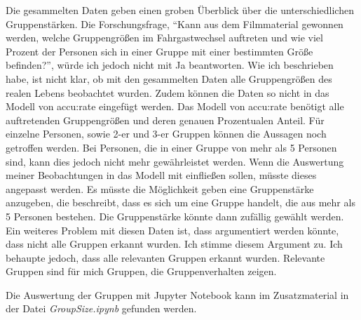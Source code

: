 Die gesammelten Daten geben einen groben Überblick über die unterschiedlichen Gruppenstärken. Die Forschungsfrage, "`Kann aus dem Filmmaterial gewonnen werden, welche Gruppengrößen im Fahrgastwechsel auftreten und wie viel Prozent der Personen sich in einer Gruppe mit einer bestimmten Größe befinden?"', würde ich jedoch nicht mit Ja beantworten. Wie ich beschrieben habe, ist nicht klar, ob mit den gesammelten Daten alle Gruppengrößen des realen Lebens beobachtet wurden. Zudem können die Daten so nicht in das Modell von accu:rate eingefügt werden. Das Modell von accu:rate benötigt alle auftretenden Gruppengrößen und deren genauen Prozentualen Anteil. Für einzelne Personen, sowie 2-er und 3-er Gruppen können die Aussagen noch getroffen werden. Bei Personen, die in einer Gruppe von mehr als 5 Personen sind, kann dies jedoch nicht mehr gewährleistet werden. Wenn die Auswertung meiner Beobachtungen in das Modell mit einfließen sollen, müsste dieses angepasst werden. Es müsste die Möglichkeit geben eine Gruppenstärke anzugeben, die beschreibt, dass es sich um eine Gruppe handelt, die aus mehr als 5 Personen bestehen. Die Gruppenstärke könnte dann zufällig gewählt werden. Ein weiteres Problem mit diesen Daten ist, dass argumentiert werden könnte, dass nicht alle Gruppen erkannt wurden. Ich stimme diesem Argument zu. Ich behaupte jedoch, dass alle relevanten Gruppen erkannt wurden. Relevante Gruppen sind für mich Gruppen, die Gruppenverhalten zeigen.

Die Auswertung der Gruppen mit \textsf{Jupyter Notebook} kann im Zusatzmaterial in der Datei \textsl{GroupSize.ipynb} gefunden werden.
